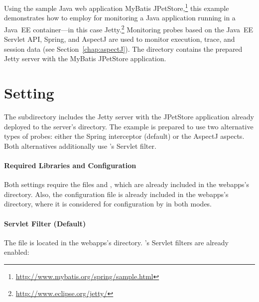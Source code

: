Using the sample Java web application %
MyBatis JPetStore,\footnote{\url{http://www.mybatis.org/spring/sample.html}} this example %
demonstrates how to employ \KiekerMonitoringPart{} for monitoring a Java application %
running in a Java~EE container---in this case Jetty.\footnote{\url{http://www.eclipse.org/jetty/}} %
Monitoring probes based on the Java~EE Servlet API, Spring, %
and AspectJ are used to monitor execution, trace, and session data (see Section~\ref{chap:aspectJ}). %
The directory \dir{\JavaEEServletExampleDistro/} contains the prepared Jetty %
server with the MyBatis JPetStore application. %

\section{Setting}

The subdirectory  includes the %
Jetty server with the JPetStore application already deployed to the server's %
 directory. The example is prepared to use two alternative %
types of \Kieker{} probes: either the \Kieker{} Spring interceptor (default) or the 
\Kieker{} AspectJ aspects. Both alternatives additionally use \Kieker{}'s Servlet 
filter. %

\paragraph{Required Libraries and \KiekerMonitoringPart{} Configuration}

Both settings require the files \file{\aspectJWeaverJar{}} and \file{\mainJar}, %
which are already included in the webapps's  directory. %
Also, the \Kieker{} configuration file is already included in the webapps's 
 directory, where it is considered for %
configuration by \KiekerMonitoringPart{} in both modes. 

\paragraph{Servlet Filter (Default)}

The file  is located in the webapps's %
 directory. \Kieker{}'s Servlet filters are already enabled: 

\setXMLListing


